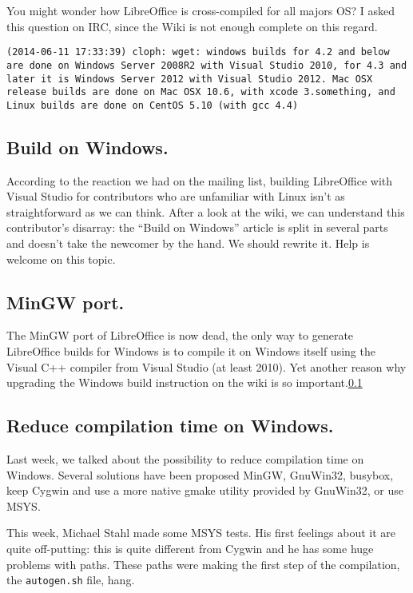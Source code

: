\documentclass{article}
\begin{document}
You might wonder how LibreOffice is cross-compiled for all majors OS? I asked this question on IRC, since the Wiki is not enough complete on this regard.

\begin{lstlisting}
(2014-06-11 17:33:39) cloph: wget: windows builds for 4.2 and below are done on Windows Server 2008R2 with Visual Studio 2010, for 4.3 and later it is Windows Server 2012 with Visual Studio 2012. Mac OSX release builds are done on Mac OSX 10.6, with xcode 3.something, and Linux builds are done on CentOS 5.10 (with gcc 4.4)
\end{lstlisting}

\subsection{Build on Windows.}

\label{fixWindowsBuildInstructions}
According to the reaction we had on the mailing list, building LibreOffice with Visual Studio for contributors who are unfamiliar with Linux isn't as straightforward as we can think\cite{visualStudioProject}. After a look at the wiki, we can understand this contributor's disarray: the ``Build on Windows'' article\cite{windowsBuildMess} is split in several parts and doesn't take the newcomer by the hand. We should rewrite it. Help is welcome on this topic.

\subsection{MinGW port.}

The MinGW port of LibreOffice is now dead\cite{mingwDead}, the only way to generate LibreOffice builds for Windows is to compile it on Windows itself using the Visual C++ compiler from Visual Studio (at least 2010). Yet another reason why upgrading the Windows build instruction on the wiki is so important.\ref{fixWindowsBuildInstructions} 

\subsection{Reduce compilation time on Windows.}

Last week, we talked about the possibility to reduce compilation time on Windows. Several solutions have been proposed MinGW, GnuWin32, busybox, keep Cygwin and use a more native gmake utility provided by GnuWin32, or use MSYS. 

This week, Michael Stahl made some MSYS tests. His first feelings about it are quite off-putting: this is quite different from Cygwin and he has some huge problems with paths. These paths were making the first step of the compilation, the \lstinline|autogen.sh| file, hang\cite{msysTest}.
\end{document}
